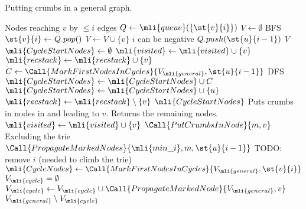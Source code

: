 \begin{algorithm}[t]
	\caption{Putting crumbs in a general graph.}\label{SEEDalg:general_crumbs}
	\begin{algorithmic}[1]
		\Comment Nodes reaching $v$ by $\le i$ edges
			\State $Q \gets \mli{queue}(\{\st{v}{i}\})$
			\State $V \gets \emptyset$
			\Comment BFS
				\State $\st{v}{i} \gets Q.pop()$
				\State $V \gets V \cup \{v\}$
				\Comment $i$ can be negative
							\State $Q.push(\st{u}{i-1})$
						\EndIf
					\EndFor
				\EndIf
			\EndWhile
			\State \Return $V$
		\EndFunction
		\Statex
			\State $\mli{CycleStartNodes} \gets \emptyset$
				\Comment 
			\State $\mli{visited} \gets \mli{visited} \cup \{v\}$
			\State $\mli{recstack} \gets \mli{recstack} \cup \{v\}$
						\State $C \gets \Call{MarkFirstNodesInCycles}{V_\mli{general}, \st{u}{i-1}}$
							\Comment DFS
						\State $\mli{CycleStartNodes} \gets \mli{CycleStartNodes} \cup C$
						\State $\mli{CycleStartNodes} \gets \mli{CycleStartNodes} \cup \{u\}$
					\EndIf
				\EndIf
			\EndFor
			\State $\mli{recstack} \gets \mli{recstack} \setminus \{v\}$
			\State \Return $\mli{CycleStartNodes}$
		\EndFunction
		\Statex
			\Statex \Comment Puts crumbs in nodes in and leading to $v$. Returns the remaining nodes.
				\State $\mli{visited} \gets \mli{visited} \cup \{v\}$
				\State $\Call{PutCrumbsInNode}{m, v}$
					 \Comment Excluding the trie
						\State $\Call{PropagateMarkedNodes}{\mli{min\_i}, m, \st{u}{i-1}}$
					\EndFor
			\EndIf
		\EndFunction
		\Statex
			\State \Comment TODO: remove $i$ (needed to climb the trie)
			\State $\mli{CycleNodes} \gets \Call{MarkFirstNodesInCycles}{V_\mli{general}, \st{v}{i}}$
			\State $V_\mli{cycle} = \emptyset$
				\State $V_\mli{cycle} \gets V_\mli{cycle} \cup \Call{PropagateMarkedNode}{V_\mli{general}, v}$
			\EndFor
			\State \Return $V_\mli{general} \setminus V_\mli{cycle}$
		\EndFunction

\end{algorithmic}
\end{algorithm}
